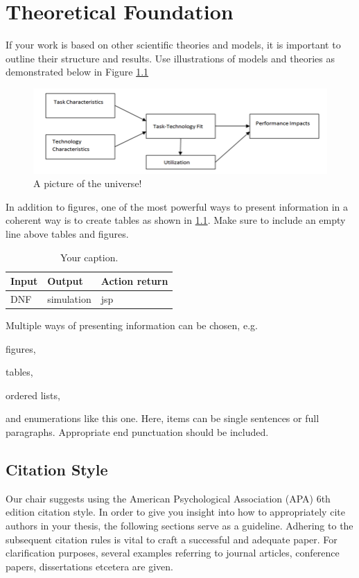 \chapter{Theoretical Foundation}

If your work is based on other scientific theories and models, it is important to outline their structure and results. Use illustrations of models and theories as demonstrated below in Figure \ref{fig1}

\begin{figure}[H]
\centering
  \includegraphics[width=1\textwidth]{grafiken/fig1}
   \caption{A picture of the universe!}
   \label{fig1}
\end{figure}


In addition to figures, one of the most powerful ways to present information in a coherent way is to create tables as shown in \ref{tab:table-name}. Make sure to include an empty line above tables and figures.
\begin{center}
\begin{table}[H]
\begin{tabularx}{\textwidth}{|X|X|X|}
\hline
Input & Output& Action return \\
\hline
DNF &  simulation & jsp\\
\hline
\end{tabularx}
\caption{\label{tab:table-name}Your caption.}
\end{table}
\end{center}


Multiple ways of presenting information can be chosen, e.g.

\begin{list}{•}{}
\item figures,
\item tables,
\item ordered lists,
\item and enumerations like this one. Here, items can be single sentences or full paragraphs. Appropriate end punctuation should be included.
\end{list}


\section{Citation Style}
Our chair suggests using the American Psychological Association (APA) 6th edition citation style. In order to give you insight into how to appropriately cite authors in your thesis, the following sections serve as a guideline. Adhering to the subsequent citation rules is vital to craft a successful and adequate paper. For clarification purposes, several examples referring to journal articles, conference papers, dissertations etcetera are given.
